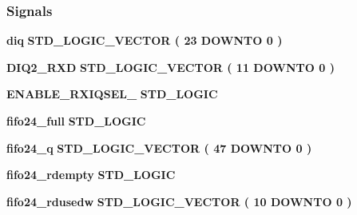 \subsubsection*{Signals}
 \begin{DoxyCompactItemize}
\item 
{\bf diq} {\bfseries \textcolor{comment}{S\+T\+D\+\_\+\+L\+O\+G\+I\+C\+\_\+\+V\+E\+C\+T\+OR}\textcolor{vhdlchar}{ }\textcolor{vhdlchar}{(}\textcolor{vhdlchar}{ }\textcolor{vhdlchar}{ } \textcolor{vhdldigit}{23} \textcolor{vhdlchar}{ }\textcolor{keywordflow}{D\+O\+W\+N\+TO}\textcolor{vhdlchar}{ }\textcolor{vhdlchar}{ } \textcolor{vhdldigit}{0} \textcolor{vhdlchar}{ }\textcolor{vhdlchar}{)}\textcolor{vhdlchar}{ }} 
\item 
{\bf D\+I\+Q2\+\_\+\+R\+XD} {\bfseries \textcolor{comment}{S\+T\+D\+\_\+\+L\+O\+G\+I\+C\+\_\+\+V\+E\+C\+T\+OR}\textcolor{vhdlchar}{ }\textcolor{vhdlchar}{(}\textcolor{vhdlchar}{ }\textcolor{vhdlchar}{ } \textcolor{vhdldigit}{11} \textcolor{vhdlchar}{ }\textcolor{keywordflow}{D\+O\+W\+N\+TO}\textcolor{vhdlchar}{ }\textcolor{vhdlchar}{ } \textcolor{vhdldigit}{0} \textcolor{vhdlchar}{ }\textcolor{vhdlchar}{)}\textcolor{vhdlchar}{ }} 
\item 
{\bf E\+N\+A\+B\+L\+E\+\_\+\+R\+X\+I\+Q\+S\+E\+L\+\_} {\bfseries \textcolor{comment}{S\+T\+D\+\_\+\+L\+O\+G\+IC}\textcolor{vhdlchar}{ }} 
\item 
{\bf fifo24\+\_\+full} {\bfseries \textcolor{comment}{S\+T\+D\+\_\+\+L\+O\+G\+IC}\textcolor{vhdlchar}{ }} 
\item 
{\bf fifo24\+\_\+q} {\bfseries \textcolor{comment}{S\+T\+D\+\_\+\+L\+O\+G\+I\+C\+\_\+\+V\+E\+C\+T\+OR}\textcolor{vhdlchar}{ }\textcolor{vhdlchar}{(}\textcolor{vhdlchar}{ }\textcolor{vhdlchar}{ } \textcolor{vhdldigit}{47} \textcolor{vhdlchar}{ }\textcolor{keywordflow}{D\+O\+W\+N\+TO}\textcolor{vhdlchar}{ }\textcolor{vhdlchar}{ } \textcolor{vhdldigit}{0} \textcolor{vhdlchar}{ }\textcolor{vhdlchar}{)}\textcolor{vhdlchar}{ }} 
\item 
{\bf fifo24\+\_\+rdempty} {\bfseries \textcolor{comment}{S\+T\+D\+\_\+\+L\+O\+G\+IC}\textcolor{vhdlchar}{ }} 
\item 
{\bf fifo24\+\_\+rdusedw} {\bfseries \textcolor{comment}{S\+T\+D\+\_\+\+L\+O\+G\+I\+C\+\_\+\+V\+E\+C\+T\+OR}\textcolor{vhdlchar}{ }\textcolor{vhdlchar}{(}\textcolor{vhdlchar}{ }\textcolor{vhdlchar}{ } \textcolor{vhdldigit}{10} \textcolor{vhdlchar}{ }\textcolor{keywordflow}{D\+O\+W\+N\+TO}\textcolor{vhdlchar}{ }\textcolor{vhdlchar}{ } \textcolor{vhdldigit}{0} \textcolor{vhdlchar}{ }\textcolor{vhdlchar}{)}\textcolor{vhdlchar}{ }} 

\end{DoxyCompactItemize}
